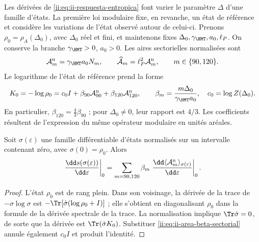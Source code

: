 Les dérivées de \eqref{ii:eq:ii-respuesta-entropica} font varier le paramètre
\(\Delta\) d'une famille d'états. La première loi modulaire fixe,
en revanche, un état de référence et considère les variations de l'état
observé autour de celui-ci. Prenons
\(\rho_0=\rho_A(\Delta_0)\), avec \(\Delta_0\) réel et fini,
et maintenons fixes \(\Delta_0,\gamma_{\HMT},a_0,\ell_P\).
On conserve la branche \(\gamma_{\HMT}>0\), \(a_0>0\).
Les aires sectorielles normalisées sont
\begin{equation}
 \mathcal A_m^{\rm n}=\gamma_{\HMT}a_0N_m,
 \qquad
 \widehat{\mathcal A}_m=\ell_P^2\mathcal A_m^{\rm n},
 \qquad m\in\{90,120\}.
 \label{ii:eq:ii-area-sector-normalizado}
\end{equation}
Le logarithme de l'état de référence prend la forme
\begin{equation}
 K_0=-\log\rho_0
 =c_0I+\beta_{90}\mathcal A_{90}^{\rm n}
         +\beta_{120}\mathcal A_{120}^{\rm n},
 \qquad
 \beta_m=\frac{m\Delta_0}{\gamma_{\HMT}a_0},
 \quad c_0=\log Z(\Delta_0).
 \label{ii:eq:ii-area-beta-sectorial}
\end{equation}
En particulier, \(\beta_{120}=\tfrac43\beta_{90}\) ; pour
\(\Delta_0\ne0\), leur rapport est \(4/3\). Les coefficients
résultent de l'expression du même opérateur modulaire en unités aréales.

\begin{theorem}
\label{ii:thm:ii-area-primera-ley}
Soit \(\sigma(\varepsilon)\) une famille différentiable d'états
normalisés sur un intervalle contenant zéro, avec
\(\sigma(0)=\rho_0\). Alors
\begin{equation}
 \left.\frac{\dd s(\sigma(\varepsilon))}{\dd\varepsilon}\right|_0
 =\sum_{m=90,120}\beta_m
   \left.\frac{\dd\langle\mathcal A_m^{\rm n}\rangle_
                       {\sigma(\varepsilon)}}{\dd\varepsilon}\right|_0.
 \label{ii:eq:ii-area-primera-ley}
\end{equation}
\end{theorem}
\begin{proof}
L'état \(\rho_0\) est de rang plein. Dans son voisinage, la dérivée
de la trace de \(-\sigma\log\sigma\) est
\(-\Tr[\dot\sigma(\log\rho_0+I)]\) ; elle s'obtient en diagonalisant
\(\rho_0\) dans la formule de la dérivée spectrale de la trace.
La normalisation implique \(\Tr\dot\sigma=0\), de sorte que la
dérivée est \(\Tr(\dot\sigma K_0)\). Substituer
\eqref{ii:eq:ii-area-beta-sectorial} annule également \(c_0I\) et
produit l'identité.
\end{proof}

